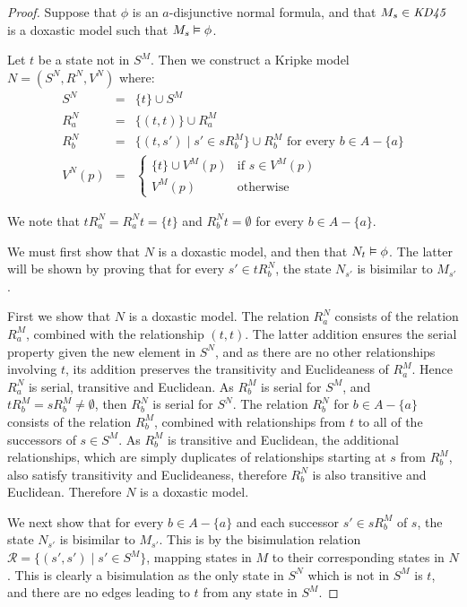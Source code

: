 \begin{proof}
Suppose that $\phi$ is an $a$-disjunctive normal formula, and that $M_s \in
\textit{KD45}$ is a doxastic model such that $M_s \vDash \phi$. 

Let $t$ be a state not in $S^M$. Then we construct a Kripke model $N = (S^N,
R^N, V^N)$ where:
\begin{eqnarray*}
S^N &=& \{t\} \cup S^M\\
R^N_a &=& \{(t, t)\} \cup R^M_a\\
R^N_b &=& \{(t, s') \mid s' \in sR^M_b\} \cup R^M_b \text{ for every $b \in A -
\{a\}$}\\
V^N(p) &=& \begin{cases}
\{t\} \cup V^M(p) & \text{if $s \in V^M(p)$}\\
V^M(p) & \text{otherwise}
\end{cases}
\end{eqnarray*}

We note that $tR^N_a = R^N_at = \{t\}$ and $R^N_bt = \emptyset$ for every $b
\in A - \{a\}$.

We must first show that $N$ is a doxastic model, and then that $N_t \vDash
\phi$. The latter will be shown by proving that for every $s' \in tR^N_b$, the
state $N_{s'}$ is bisimilar to $M_{s'}$.

First we show that $N$ is a doxastic model. The relation $R^N_a$ consists of the
relation $R^M_a$, combined with the relationship $(t,t)$. The latter addition
ensures the serial property given the new element in $S^N$, and as there are no
other relationships involving $t$, its addition preserves the transitivity and
Euclideaness of $R^M_a$. Hence $R^N_a$ is serial, transitive and Euclidean.
As $R^M_b$ is serial for $S^M$, and $tR^M_b = sR^M_b \ne \emptyset$, then
$R^N_b$ is serial for $S^N$. The relation $R^N_b$ for $b \in A - \{a\}$ consists
of the relation $R^M_b$, combined with relationships from $t$ to all of the
successors of $s \in S^M$. As $R^M_b$ is transitive and Euclidean, the
additional relationships, which are simply duplicates of relationships starting
at $s$ from $R^M_b$, also satisfy transitivity and Euclideaness, therefore
$R^N_b$ is also transitive and Euclidean. Therefore $N$ is a doxastic model.

We next show that for every $b \in A - \{a\}$ and each successor $s' \in sR^M_b$
of $s$, the state $N_{s'}$ is bisimilar to $M_{s'}$. This is by the bisimulation
relation $\mathcal{R} = \{(s', s') \mid s' \in S^M \}$, mapping states in
$M$ to their corresponding states in $N$. This is clearly a bisimulation as the
only state in $S^N$ which is not in $S^M$ is $t$, and there are no edges leading
to $t$ from any state in $S^M$.


\end{proof}
